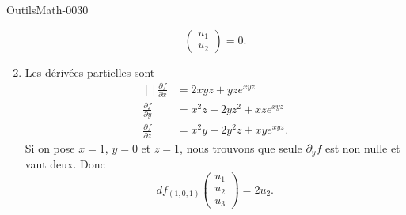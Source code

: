 \begin{corrige}{OutilsMath-0030}
\begin{enumerate}
\begin{equation}
\begin{pmatrix}
                    u_1    \\ 
                    u_2    
                \end{pmatrix}=0.
            \end{equation}
        \item
            Les dérivées partielles sont
            \begin{equation}
                \begin{aligned}[]
                    \frac{ \partial f }{ \partial x }&=2xyz+yz e^{xyz}\\
                    \frac{ \partial f }{ \partial y }&=x^2z+2yz^2+xz e^{xyz}\\
                    \frac{ \partial f }{ \partial z }&=x^2y+2y^2z+xy e^{xyz}.
                \end{aligned}
            \end{equation}
            Si on pose $x=1$, $y=0$ et $z=1$, nous trouvons que seule $\partial_yf$ est non nulle et vaut deux. Donc
            \begin{equation}
                df_{(1,0,1)}\begin{pmatrix}
                    u_1    \\ 
                    u_2    \\ 
                    u_3    
                \end{pmatrix}=2u_2.
            \end{equation}
    \end{enumerate}

\end{corrige}

